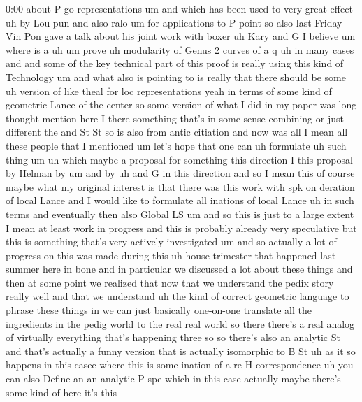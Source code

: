 \begin{unfinished}{0:00}
about  P  go
representations  um  and  which  has  been
used  to  very  great  effect  uh  by  Lou  pun
and  also
ralo
um  for  applications  to  P
point  so  also  last  Friday  Vin  Pon  gave  a
talk  about  his  joint  work  with
boxer  uh  Kary  and  G  I  believe  um  where
is  a
uh  um  prove  uh  modularity  of  Genus  2
curves  of  a  q  uh  in  many  cases  and  and
some  of  the  key  technical  part  of  this
proof  is  really  using  this  kind  of
Technology
um
and  what  also  is  pointing  to  is  really
that  there  should  be
some  uh  version  of  like
theal  for  loc
representations  yeah  in  terms  of  some
kind  of  geometric  Lance  of  the
center  so  some  version  of  what  I  did  in
my  paper  was  long
thought
mention  here  I  there  something  that's  in
some  sense  combining  or  just
different  the  and  St  St  so  is  also  from
antic
citiation  and  now  was  all  I  mean  all
these  people  that  I  mentioned  um  let's
hope  that  one  can  uh  formulate  uh  such
thing
um  uh  which  maybe  a  proposal  for
something  this  direction  I  this  proposal
by  Helman
by  um  and  by  uh  and
G  in  this
direction  and
so  I  mean  this  of  course  maybe  what  my
original  interest  is
that  there  was  this  work  with  spk  on
deration  of  local  Lance  and  I  would  like
to  formulate  all  inations  of  local  Lance
uh  in  such
terms  and  eventually  then  also  Global  LS
um  and  so  this  is  just  to  a  large  extent
I  mean  at  least  work  in  progress  and
this  is  probably  already  very
speculative  but  this  is  something  that's
very  actively
investigated  um
and
so  actually  a  lot  of  progress  on  this
was  made  during  this  uh  house  trimester
that  happened  last  summer  here  in  bone
and  in  particular  we  discussed  a  lot
about  these  things  and  then  at  some
point  we
realized  that  now  that  we  understand  the
pedix  story  really  well  and  that  we
understand  uh  the  kind  of  correct
geometric  language  to  phrase  these
things  in  we  can  just  basically
one-on-one  translate  all  the  ingredients
in  the  pedig  world  to  the  real  real
world  so  there  there's  a
real  analog  of  virtually
everything  that's  happening
three  so  so  there's  also  an
analytic
St  and  that's  actually  a  funny  version
that  is  actually  isomorphic  to  B
St  uh  as  it  so  happens  in  this  casee
where  this  is  some  ination  of  a  re  H
correspondence  uh  you  can  also  Define
an  an  analytic
P  spe  which  in  this  case  actually  maybe
there's  some  kind  of  here  it's  this

\end{unfinished}
